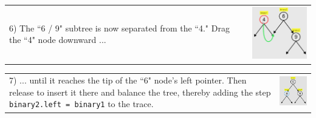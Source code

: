 \noindent \begin{tabular}{m{4.6cm} m{3.4cm}}

6) The ``6 / 9" subtree is now separated from the ``4." Drag the ``4"
node downward ...

& \includegraphics[width=3.4cm]{img/examples/bst-6.png}
\end{tabular}

\noindent \begin{tabular}{m{4.6cm} m{3.4cm}}

7) ... until it reaches the tip of the ``6" node's left pointer. Then
release to insert it there and balance the tree, thereby adding the step
\texttt{binary2.left = binary1} to the trace.

& \includegraphics[width=3.4cm]{img/examples/bst-7.png}
\end{tabular}

